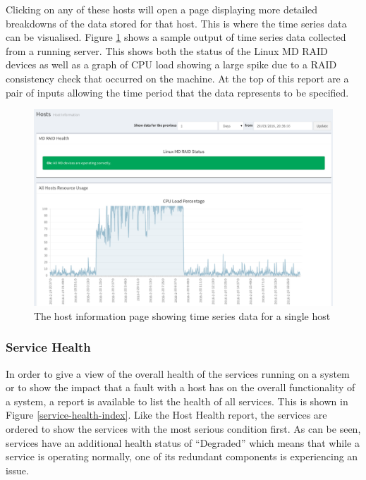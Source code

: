 \documentclass[bsc,deptreport,twoside,parskip,singlespacing,notimes]{infthesis}
\begin{document}
	Clicking on any of these hosts will open a page displaying more detailed
	breakdowns of the data stored for that host.  This is where the time series
	data can be visualised.  Figure \ref{host-information} shows a sample
	output of time series data collected from a running server.  This shows both
	the status of the Linux MD RAID devices as well as a graph of CPU load
	showing a large spike due to a RAID consistency check that occurred on the
	machine.  At the top of this report are a pair of inputs allowing the time
	period that the data represents to be specified.

\begin{figure}[H]
	\centering
	\caption{The host information page showing time series data for a single host}
	\label{host-information}
	\includegraphics[scale=0.43]{assets/screenshots/host-information.pdf}
\end{figure}

\subsubsection{Service Health}

	In order to give a view of the overall health of the services running on a
	system or to show the impact that a fault with a host has on the overall
	functionality of a system, a report is available to list the health of all
	services.  This is shown in Figure \ref{service-health-index}. Like the
	Host Health report, the services are ordered to show the services with the most
	serious condition first.  As can be seen, services have an additional health
	status of ``Degraded'' which means that while a service is operating normally,
	one of its redundant components is experiencing an issue.
\end{document}
